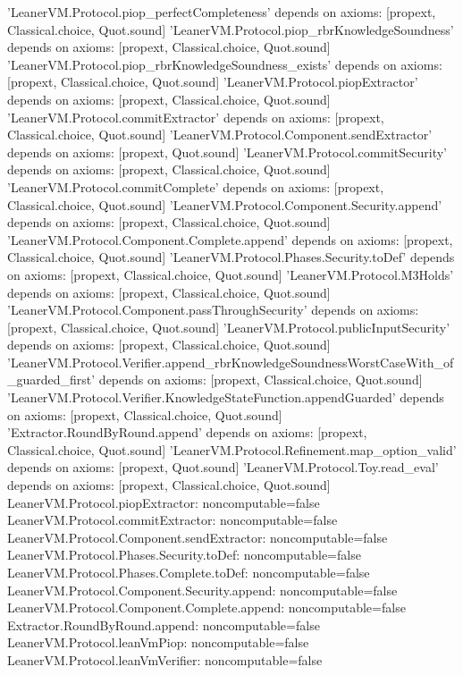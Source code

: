
\begin{srccode}
'LeanerVM.Protocol.piop_perfectCompleteness' depends on axioms: [propext, Classical.choice, Quot.sound]
'LeanerVM.Protocol.piop_rbrKnowledgeSoundness' depends on axioms: [propext, Classical.choice, Quot.sound]
'LeanerVM.Protocol.piop_rbrKnowledgeSoundness_exists' depends on axioms: [propext, Classical.choice, Quot.sound]
'LeanerVM.Protocol.piopExtractor' depends on axioms: [propext, Classical.choice, Quot.sound]
'LeanerVM.Protocol.commitExtractor' depends on axioms: [propext, Classical.choice, Quot.sound]
'LeanerVM.Protocol.Component.sendExtractor' depends on axioms: [propext, Quot.sound]
'LeanerVM.Protocol.commitSecurity' depends on axioms: [propext, Classical.choice, Quot.sound]
'LeanerVM.Protocol.commitComplete' depends on axioms: [propext, Classical.choice, Quot.sound]
'LeanerVM.Protocol.Component.Security.append' depends on axioms: [propext, Classical.choice, Quot.sound]
'LeanerVM.Protocol.Component.Complete.append' depends on axioms: [propext, Classical.choice, Quot.sound]
'LeanerVM.Protocol.Phases.Security.toDef' depends on axioms: [propext, Classical.choice, Quot.sound]
'LeanerVM.Protocol.M3Holds' depends on axioms: [propext, Classical.choice, Quot.sound]
'LeanerVM.Protocol.Component.passThroughSecurity' depends on axioms: [propext, Classical.choice, Quot.sound]
'LeanerVM.Protocol.publicInputSecurity' depends on axioms: [propext, Classical.choice, Quot.sound]
'LeanerVM.Protocol.Verifier.append_rbrKnowledgeSoundnessWorstCaseWith_of_guarded_first' depends on axioms: [propext,
 Classical.choice,
 Quot.sound]
'LeanerVM.Protocol.Verifier.KnowledgeStateFunction.appendGuarded' depends on axioms: [propext,
 Classical.choice,
 Quot.sound]
'Extractor.RoundByRound.append' depends on axioms: [propext, Classical.choice, Quot.sound]
'LeanerVM.Protocol.Refinement.map_option_valid' depends on axioms: [propext, Quot.sound]
'LeanerVM.Protocol.Toy.read_eval' depends on axioms: [propext, Classical.choice, Quot.sound]
LeanerVM.Protocol.piopExtractor: noncomputable=false
LeanerVM.Protocol.commitExtractor: noncomputable=false
LeanerVM.Protocol.Component.sendExtractor: noncomputable=false
LeanerVM.Protocol.Phases.Security.toDef: noncomputable=false
LeanerVM.Protocol.Phases.Complete.toDef: noncomputable=false
LeanerVM.Protocol.Component.Security.append: noncomputable=false
LeanerVM.Protocol.Component.Complete.append: noncomputable=false
Extractor.RoundByRound.append: noncomputable=false
LeanerVM.Protocol.leanVmPiop: noncomputable=false
LeanerVM.Protocol.leanVmVerifier: noncomputable=false

\end{srccode}

